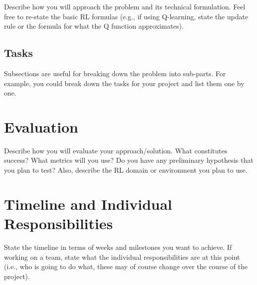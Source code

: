 \documentclass{article}
\begin{document}
Describe how you will approach the problem and its technical formulation. Feel free to re-state the basic RL formulas (e.g., if using Q-learning, state the update rule or the formula for what the Q function approximates). 



\subsection{Tasks}

Subsections are useful for breaking down the problem into sub-parts. For example, you could break down the tasks for your project and list them one by one. 



\section{Evaluation}

Describe how you will evaluate your approach/solution. What constitutes success? What metrics will you use? Do you have any preliminary hypothesis that you plan to test? Also, describe the RL domain or environment you plan to use. 




\section{Timeline and Individual Responsibilities}

State the timeline in terms of weeks and milestones you want to achieve. If working on a team, state what the individual responsibilities are at this point (i.e., who is going to do what, these may of course change over the course of the project). 



\end{document}
